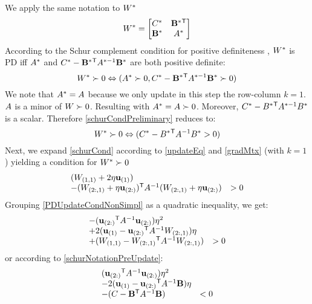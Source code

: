 \documentclass{article}
\begin{document}
We apply the same notation to ${{W^*}}$
\begin{equation}
{{{W^*}}}= \left[ \begin{matrix} C^* & \mathbf{B^*}{}^\mathsf{T} \\ \mathbf{B^*} & {A^*} \end{matrix} \right]
\end{equation}
According to the Schur complement condition for positive definiteness , ${{W^*}}$ is PD iff ${A}^*$ and $C^* - \mathbf{B}^*{}^\mathsf{T} {A}^{*-1} \mathbf{B}^*$ are both positive definite:
\begin{equation}
{{W^*}} \succ  0 \Leftrightarrow ({A}^* \succ  0, C^* - \mathbf{B}^*{}^\mathsf{T} {A}^{*-1} \mathbf{B}^* \succ  0)
\label{schurCondPreliminary}
\end{equation}
We note that ${A}^* = {A}$ because we only update in this step
the row-column $k=1$. ${A}$ is a minor of ${W} \succ 0$. Resulting
with ${A}^*={A} \succ 0$. Moreover, $C^* - B^*{}^\mathsf{T} A^{*-1} B^*$
is a scalar. Therefore \eqref{schurCondPreliminary} reduces to:
\begin{equation}
{W^*} \succ  0 \Leftrightarrow (C^* - B^*{}^\mathsf{T} A^{-1} B^* >  0)
\label{schurCond}
\end{equation}
Next, we expand \eqref{schurCond} according to \eqref{updateEq} and \eqref{gradMtx} (with $k=1$) yielding a condition for ${{W^*}} \succ  0$
\begin{equation}
\begin{array}{ll} 
({W}_{(1,1)} + 2\eta \mathbf{u}_{(1)})  \\
-({W}_{(2:,1)} + \eta \mathbf{u}_{(2:)}){}^\mathsf{T} {A}^{-1} ({W}_{(2:,1)} + \eta \mathbf{u}_{(2:)})  & > 0
\end{array}
\label{PDUpdateCondNonSimpl}
\end{equation}
Grouping \eqref{PDUpdateCondNonSimpl} as a quadratic inequality, we get:
\begin{equation}
\begin{array}{ll} 
-(\mathbf{u}_{(2:)}{}^\mathsf{T} {A}^{-1} \mathbf{u}_{(2:)})\eta^2 \\
+2(\mathbf{u}_{(1)} - \mathbf{u}_{(2:)}{}^\mathsf{T} {A}^{-1}{W}_{(2:,1)})\eta\\
+({W}_{(1,1)} - {W}_{(2:,1)}{}^\mathsf{T}  {A}^{-1} {W}_{(2:,1)}) & > 0
\end{array}
\label{PDUpdateCondQuadFormWithW}
\end{equation}
or according to \eqref{schurNotationPreUpdate}:
\begin{equation}
\begin{array}{ll} 
(\mathbf{u}_{(2:)}{}^\mathsf{T} {A}^{-1} \mathbf{u}_{(2:)}) \eta^2 \\
-2(\mathbf{u}_{(1)} - \mathbf{u}_{(2:)}{}^\mathsf{T} {A}^{-1}\mathbf{B})\eta \\
-(C - \mathbf{B}{}^\mathsf{T}  {A}^{-1} \mathbf{B}) & < 0
\end{array}
\label{PDUpdateCondQuadForm}
\end{equation}
\end{document}
